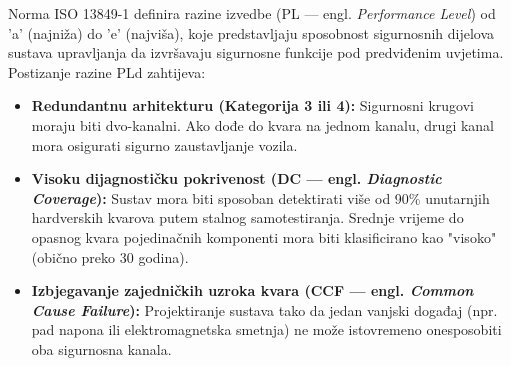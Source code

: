 \documentclass[12pt,a4paper]{article}
\begin{document}
Norma ISO 13849-1 definira razine izvedbe (PL — engl. \textit{Performance Level}) od 'a' (najniža) do 'e' (najviša), koje predstavljaju sposobnost sigurnosnih dijelova sustava upravljanja da izvršavaju sigurnosne funkcije pod predviđenim uvjetima. Postizanje razine PLd zahtijeva:
\begin{itemize}
    \item \textbf{Redundantnu arhitekturu (Kategorija 3 ili 4):} Sigurnosni krugovi moraju biti dvo-kanalni. Ako dođe do kvara na jednom kanalu, drugi kanal mora osigurati sigurno zaustavljanje vozila.
    \item \textbf{Visoku dijagnostičku pokrivenost (DC — engl. \textit{Diagnostic Coverage}):} Sustav mora biti sposoban detektirati više od 90\% unutarnjih hardverskih kvarova putem stalnog samotestiranja.
     Srednje vrijeme do opasnog kvara pojedinačnih komponenti mora biti klasificirano kao "visoko" (obično preko 30 godina).
    \item \textbf{Izbjegavanje zajedničkih uzroka kvara (CCF — engl. \textit{Common Cause Failure}):} Projektiranje sustava tako da jedan vanjski događaj (npr. pad napona ili elektromagnetska smetnja) ne može istovremeno onesposobiti oba sigurnosna kanala.
\end{itemize}
\end{document}
